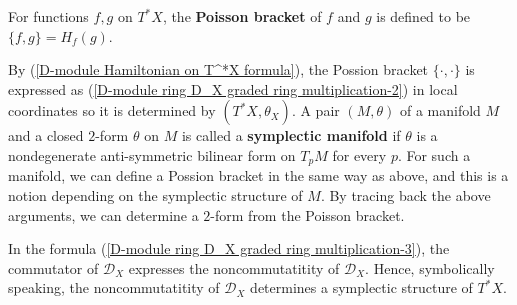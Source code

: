 \begin{definition}
For functions $f,g$ on $T^*X$, the \textbf{Poisson bracket} of $f$ and $g$ is defined to be $\{f,g\}=H_f(g)$.
\end{definition}

By (\ref{D-module Hamiltonian on T^*X formula}), the Possion bracket $\{\cdot,\cdot\}$ is expressed as (\ref{D-module ring D_X graded ring multiplication-2}) in local coordinates so it is determined by $(T^*X,\theta_X)$. A pair $(M,\theta)$ of a manifold $M$ and a closed $2$-form $\theta$ on $M$ is called a \textbf{symplectic manifold} if $\theta$ is a nondegenerate anti-symmetric bilinear form on $T_pM$ for every $p$. For such a manifold, we can define a Possion bracket in the same way as above, and this is a notion depending on the symplectic structure of $M$. By tracing back the above arguments, we can determine a $2$-form from the Poisson bracket.\par
In the formula (\ref{D-module ring D_X graded ring multiplication-3}), the commutator of $\mathscr{D}_X$ expresses the noncommutatitity of $\mathscr{D}_X$. Hence, symbolically speaking, the noncommutatitity of $\mathscr{D}_X$ determines a symplectic structure of $T^*X$.

